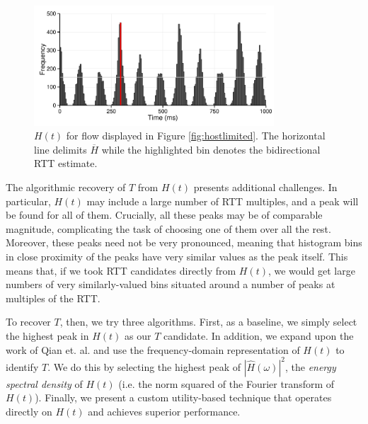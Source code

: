 \begin{figure}
  \centering
  \includegraphics[width=0.8\textwidth]{figures/malawi/rttbin.pdf}
  \caption{$H(t)$ for flow displayed in Figure \ref{fig:hostlimited}. The horizontal line delimits $\overline{H}$ while the highlighted bin denotes the bidirectional RTT estimate.\label{fig:histogram}}
\end{figure}


%
%
The algorithmic recovery of $T$ from $H(t)$ presents additional challenges. In particular, $H(t)$ may include a large number of RTT multiples, and a peak will be found for all of them. Crucially, all these peaks may be of comparable magnitude, complicating the task of choosing one of them over all the rest. Moreover, these peaks need not be very pronounced, meaning that histogram bins in close proximity of the peaks have very similar values as the peak itself. This means that, if we took RTT candidates directly from $H(t)$, we would get large numbers of very similarly-valued bins situated around a number of peaks at multiples of the RTT. 

To recover $T$, then, we try three algorithms. First, as a baseline, we simply select the highest peak in $H(t)$ as our $T$ candidate. In addition, we expand upon the work of Qian et. al. \cite{Qian:2009p429} and use the frequency-domain representation of $H(t)$ to identify $T$. We do this by selecting the highest peak of $|\hat{H}(\omega)|^2$, the \emph{energy spectral density} of $H(t)$ (i.e. the norm squared of the Fourier transform of $H(t)$). Finally, we present a custom utility-based technique that operates directly on $H(t)$ and achieves superior performance.

